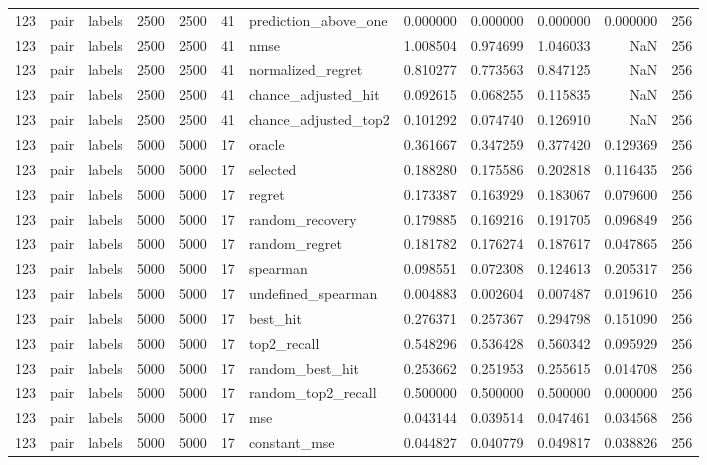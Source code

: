 \begin{tabular}{rllrrrlrrrrr}
123 & pair & labels & 2500 & 2500 & 41 & prediction_above_one & 0.000000 & 0.000000 & 0.000000 & 0.000000 & 256 \\
123 & pair & labels & 2500 & 2500 & 41 & nmse & 1.008504 & 0.974699 & 1.046033 & NaN & 256 \\
123 & pair & labels & 2500 & 2500 & 41 & normalized_regret & 0.810277 & 0.773563 & 0.847125 & NaN & 256 \\
123 & pair & labels & 2500 & 2500 & 41 & chance_adjusted_hit & 0.092615 & 0.068255 & 0.115835 & NaN & 256 \\
123 & pair & labels & 2500 & 2500 & 41 & chance_adjusted_top2 & 0.101292 & 0.074740 & 0.126910 & NaN & 256 \\
123 & pair & labels & 5000 & 5000 & 17 & oracle & 0.361667 & 0.347259 & 0.377420 & 0.129369 & 256 \\
123 & pair & labels & 5000 & 5000 & 17 & selected & 0.188280 & 0.175586 & 0.202818 & 0.116435 & 256 \\
123 & pair & labels & 5000 & 5000 & 17 & regret & 0.173387 & 0.163929 & 0.183067 & 0.079600 & 256 \\
123 & pair & labels & 5000 & 5000 & 17 & random_recovery & 0.179885 & 0.169216 & 0.191705 & 0.096849 & 256 \\
123 & pair & labels & 5000 & 5000 & 17 & random_regret & 0.181782 & 0.176274 & 0.187617 & 0.047865 & 256 \\
123 & pair & labels & 5000 & 5000 & 17 & spearman & 0.098551 & 0.072308 & 0.124613 & 0.205317 & 256 \\
123 & pair & labels & 5000 & 5000 & 17 & undefined_spearman & 0.004883 & 0.002604 & 0.007487 & 0.019610 & 256 \\
123 & pair & labels & 5000 & 5000 & 17 & best_hit & 0.276371 & 0.257367 & 0.294798 & 0.151090 & 256 \\
123 & pair & labels & 5000 & 5000 & 17 & top2_recall & 0.548296 & 0.536428 & 0.560342 & 0.095929 & 256 \\
123 & pair & labels & 5000 & 5000 & 17 & random_best_hit & 0.253662 & 0.251953 & 0.255615 & 0.014708 & 256 \\
123 & pair & labels & 5000 & 5000 & 17 & random_top2_recall & 0.500000 & 0.500000 & 0.500000 & 0.000000 & 256 \\
123 & pair & labels & 5000 & 5000 & 17 & mse & 0.043144 & 0.039514 & 0.047461 & 0.034568 & 256 \\
123 & pair & labels & 5000 & 5000 & 17 & constant_mse & 0.044827 & 0.040779 & 0.049817 & 0.038826 & 256 \\

\end{tabular}
